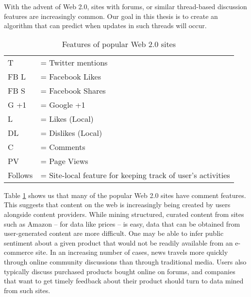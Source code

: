 With the advent of Web 2.0, sites with forums, or similar thread-based
discussion features are increasingly common.  Our goal in this thesis
is to create an algorithm that can predict when updates in such
threads will occur.
\begin{table}\label{table:web20}
	{\footnotesize
\caption{Features of popular Web 2.0 sites}
	\begin{tabular}{l l}
		T &= Twitter mentions\\
	 FB L &= Facebook Likes \\
		FB S &= Facebook Shares\\
	G +1 &= Google +1\\
		   L&= Likes (Local) \\
   		DL &= Dislikes (Local) \\
			C &= Comments \\
		PV &= Page Views \\
   Follows &= Site-local feature for keeping track of user's activities
	\end{tabular}
}
\end{table}

Table \ref{table:web20} shows us that many of the popular Web 2.0
sites have comment features. This suggests that content on the web is
increasingly being created by users alongside content providers.
 While mining structured, curated content from sites such as Amazon --
for data like prices -- is easy, data that can be obtained from
user-generated content are more difficult. One may be able to infer
public sentiment about a given product that would not be readily
available from an e-commerce site.
In an increasing number of cases, news travels more quickly through
online community discussions than through traditional media. Users also
typically discuss purchased products bought online on forums,
and companies that want to get timely feedback about their product
should turn to data mined from such sites.

